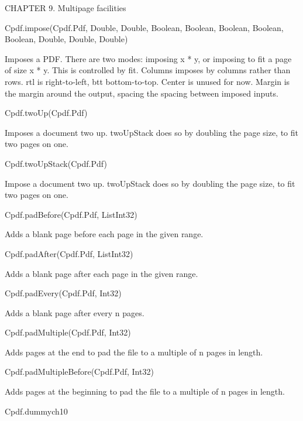 CHAPTER 9. Multipage facilities

Cpdf.impose(Cpdf.Pdf, Double, Double, Boolean, Boolean, Boolean, Boolean, Boolean, Double, Double, Double)


Imposes a PDF. There are two modes: imposing x * y, or imposing
to fit a page of size x * y. This is controlled by fit. Columns imposes by
columns rather than rows. rtl is right-to-left, btt bottom-to-top. Center is
unused for now. Margin is the margin around the output, spacing the spacing
between imposed inputs.


Cpdf.twoUp(Cpdf.Pdf)


Imposes a document two up. twoUpStack does so by doubling the
page size, to fit two pages on one.


Cpdf.twoUpStack(Cpdf.Pdf)


Impose a document two up. twoUpStack does so by doubling the
page size, to fit two pages on one.


Cpdf.padBefore(Cpdf.Pdf, List{Int32})


Adds a blank page before each page in the given
range.


Cpdf.padAfter(Cpdf.Pdf, List{Int32})


Adds a blank page after each page in the given
range.


Cpdf.padEvery(Cpdf.Pdf, Int32)


Adds a blank page after every n pages.


Cpdf.padMultiple(Cpdf.Pdf, Int32)


Adds pages at the end to pad the file to a
multiple of n pages in length.


Cpdf.padMultipleBefore(Cpdf.Pdf, Int32)


Adds pages at the beginning to pad the file to a
multiple of n pages in length.


Cpdf.dummych10

